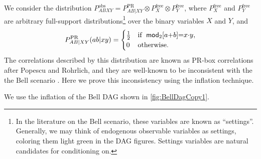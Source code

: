 We consider the distribution ${P^{\text{obs}}_{A B X Y} = P^{\text{PR}}_{A B | X Y} \otimes P^{\text{free}}_{X} \otimes P^{\text{free}}_{Y}}$, where $P^{\text{free}}_{X}$ and $P^{\text{free}}_{Y}$ are arbitrary full-support distributions\footnote{In the literature on the Bell scenario, these variables are known as ``settings''. Generally, we may think of endogenous observable variables as settings, coloring them light green in the DAG figures. Settings variables are natural candidates for conditioning on.} over the binary variables $X$ and $Y$, and
\begin{align}\begin{split}\label{eq:PRbox}
P^{\text{PR}}_{A B | X Y}\parens{a b |x y}=\begin{cases}\tfrac{1}{2}&\text{if }\; \SmallNamedFunction[2]{mod}{a\cramp{+}b}\eql x\cramp{\cdot} y, \\ 0&\text{otherwise}.\end{cases}
\end{split}\end{align}
The correlations described by this distribution are known as PR-box correlations after Popescu and Rohrlich, and they are well-known to be inconsistent with the the Bell scenario \cite{PROriginal,PRUnit}. Here we prove this inconsistency using the inflation technique. 

We use the inflation of the Bell DAG shown in \cref{fig:BellDagCopy1}.

